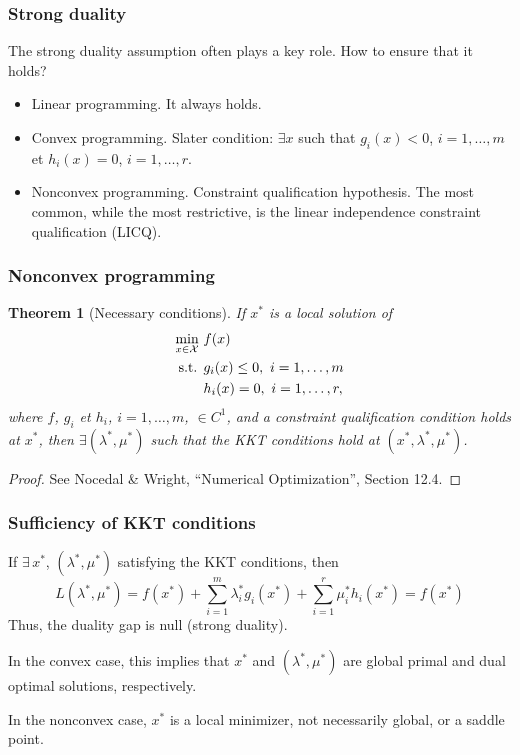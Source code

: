 \documentclass[usepdftitle=false]{beamer}
\newtheorem{thm}{Theorem}
\def\red{\color{red}}
\begin{document}
\begin{frame}
\frametitle{Strong duality}

\mbox{}

The strong duality assumption often plays a key role. How to ensure that it holds?
\begin{itemize}
\item
Linear programming. It always holds.
\item
Convex programming. Slater condition: $\exists x$ such that $g_i(x) < 0$, $i = 1,\ldots,m$ et $h_i(x) = 0$, $i = 1,\ldots,r$.
\item
Nonconvex programming. Constraint qualification hypothesis. The most common, while the most restrictive, is the linear independence constraint qualification (LICQ).
\end{itemize}

\end{frame}

\begin{frame}
\frametitle{Nonconvex programming}

\begin{thm}[Necessary conditions]
If $x^*$ is a local solution of
\begin{align*}
\min_{x \in {\mathcal{X}}} \ & f(x) \\
\mbox{s.t. } & g_i(x) \leq 0,\ i = 1,\ldots,m \\
& h_i(x) = 0,\ i = 1,\ldots,r,
\end{align*}
where $f$, $g_i$ et $h_i$, $i = 1,\ldots,m$, $\in C^1$, and a constraint qualification condition holds at $x^*$, then
$\exists (\lambda^*, \mu^*)$ such that the KKT conditions hold at $(x^*,\lambda^*, \mu^*)$.
\end{thm}

\begin{proof}
See Nocedal \& Wright, ``Numerical Optimization'', Section 12.4.
\end{proof}

\end{frame}

\begin{frame}
	\frametitle{Sufficiency of KKT conditions}
	
	If $\exists\, x^*$, $(\lambda^*, \mu^*)$ satisfying the KKT conditions, then
	$$
	L(\lambda^*, \mu^*) = f(x^*) + \sum_{i = 1}^m \lambda_i^* g_i(x^*) + \sum_{i = 1}^r \mu_i^* h_i(x^*) = f(x^*)
	$$
	Thus, the duality gap is null ({\red strong duality}).
		
	\mbox{}
	
	In the convex case, this implies that $x^*$ and $(\lambda^*, \mu^*)$ are global primal and dual optimal solutions, respectively.

	\mbox{}

	In the nonconvex case, $x^*$ is a local minimizer, not necessarily global, or a saddle point.
	
	
\end{frame}
\end{document}
